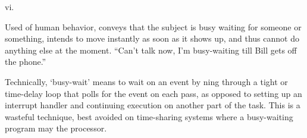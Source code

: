  vi.

Used of human behavior, conveys that the subject is busy waiting for someone or
something, intends to move instantly as soon as it shows up, and thus cannot do
anything else at the moment. ``Can't talk now, I'm busy-waiting till Bill gets
off the phone.''

Technically, `busy-wait' means to wait on an event by ning
through a tight or time-delay loop that polls for the event on each pass, as
opposed to setting up an interrupt handler and continuing execution on another
part of the task. This is a wasteful technique, best avoided on time-sharing
systems where a busy-waiting program may  the processor.

